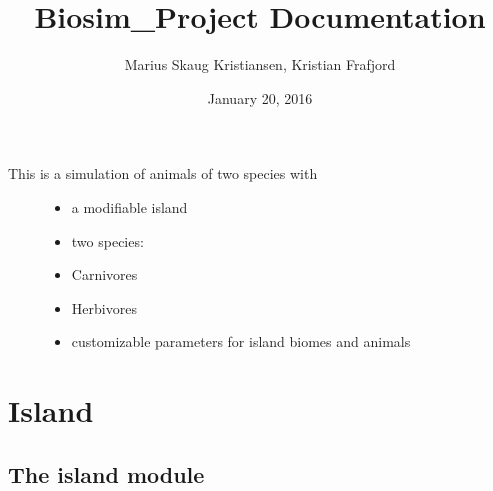 \documentclass[a4paper,10pt,openany,oneside]{sphinxmanual}
\title{Biosim\_Project Documentation}
\date{January 20, 2016}
\author{Marius Skaug Kristiansen, Kristian Frafjord}
\begin{document}
\maketitle
\tableofcontents
{}\label{index::doc}

\begin{description}
\item[{This is a simulation of animals of two species with}] \leavevmode\begin{itemize}
\item {} 
a modifiable island

\item {} 
two species:

\end{itemize}
\begin{itemize}
\item {} 
Carnivores

\item {} 
Herbivores

\end{itemize}
\begin{itemize}
\item {} 
customizable parameters for island biomes and animals

\end{itemize}

\end{description}


\chapter{Island}
\label{island::doc}\label{island:welcome-to-biosim-project-s-documentation}\label{island:island}

\section{The island module}
\label{island:module-biosim.island}\label{island:the-island-module}
\end{document}
